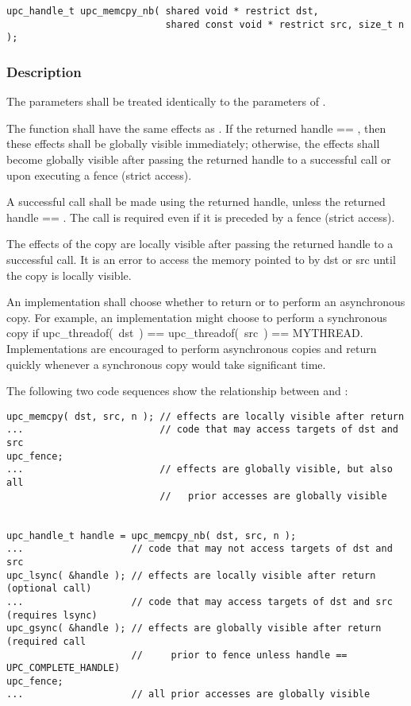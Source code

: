 \begin{verbatim}
upc_handle_t upc_memcpy_nb( shared void * restrict dst,
                            shared const void * restrict src, size_t n );
\end{verbatim}

\subsubsection{Description}

\npf The parameters shall be treated identically to the parameters of
\memcpy{}.

\np The \function{} function shall have the same effects as \memcpy{}.
If the returned handle == \complete{}, then these effects shall be globally
visible immediately; otherwise, the effects shall become globally visible after
passing the returned handle to a successful \gsync{} call or upon executing a
fence (strict access).

\np A successful \gsync{} call shall be made using the returned handle,
unless the returned handle == \complete{}.  The call is required even if it is
preceded by a fence (strict access).

\np The effects of the copy are locally visible after passing the
returned handle to a successful \lsync{} call.  It is an error to access the
memory pointed to by dst or src until the copy is locally visible.

\np An implementation shall choose whether to return \complete{} or to
perform an asynchronous copy.  For example, an implementation might choose to
perform a synchronous copy if upc\_threadof(~dst~) == upc\_threadof(~src~) ==
MYTHREAD.  Implementations are encouraged to perform asynchronous copies and
return quickly whenever a synchronous copy would take significant time.

\np The following two code sequences show the relationship between
\memcpy{} and \function{}:

\begin{verbatim}
upc_memcpy( dst, src, n ); // effects are locally visible after return
...                        // code that may access targets of dst and src
upc_fence;                 
...                        // effects are globally visible, but also all
                           //   prior accesses are globally visible


upc_handle_t handle = upc_memcpy_nb( dst, src, n );
...                   // code that may not access targets of dst and src
upc_lsync( &handle ); // effects are locally visible after return (optional call)
...                   // code that may access targets of dst and src (requires lsync)
upc_gsync( &handle ); // effects are globally visible after return (required call
                      //     prior to fence unless handle == UPC_COMPLETE_HANDLE)
upc_fence;
...                   // all prior accesses are globally visible
\end{verbatim}

